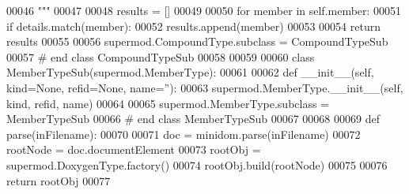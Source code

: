\begin{DoxyCode}
00046 \textcolor{stringliteral}{        """}
00047 
00048         results = []
00049 
00050         \textcolor{keywordflow}{for} member \textcolor{keywordflow}{in} self.member:
00051             \textcolor{keywordflow}{if} details.match(member):
00052                 results.append(member)
00053 
00054         \textcolor{keywordflow}{return} results
00055 
00056 supermod.CompoundType.subclass = CompoundTypeSub
00057 \textcolor{comment}{# end class CompoundTypeSub}
00058 
00059 
00060 \textcolor{keyword}{class }MemberTypeSub(supermod.MemberType):
00061 
00062     \textcolor{keyword}{def }__init__(self, kind=None, refid=None, name=''):
00063         supermod.MemberType.\_\_init\_\_(self, kind, refid, name)
00064 
00065 supermod.MemberType.subclass = MemberTypeSub
00066 \textcolor{comment}{# end class MemberTypeSub}
00067 
00068 
00069 \textcolor{keyword}{def }parse(inFilename):
00070 
00071     doc = minidom.parse(inFilename)
00072     rootNode = doc.documentElement
00073     rootObj = supermod.DoxygenType.factory()
00074     rootObj.build(rootNode)
00075 
00076     \textcolor{keywordflow}{return} rootObj
00077 
\end{DoxyCode}
